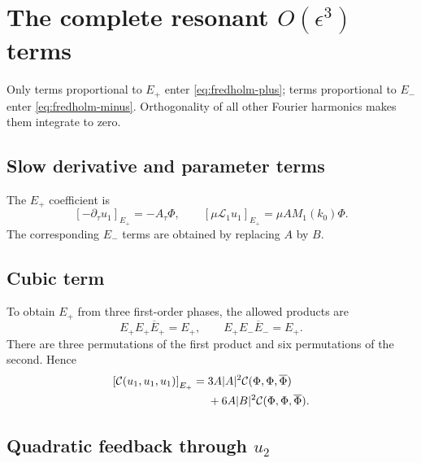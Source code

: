 \documentclass[11pt]{article}
\newcommand{\cC}{\mathcal{C}}
\newcommand{\cL}{\mathcal{L}}
\begin{document}
\section{The complete resonant \texorpdfstring{$O(\epsilon^3)$}{O(epsilon cubed)} terms}
\label{sec:o3-resonance}

Only terms proportional to $E_+$ enter \eqref{eq:fredholm-plus}; terms
proportional to $E_-$ enter \eqref{eq:fredholm-minus}.  Orthogonality of all
other Fourier harmonics makes them integrate to zero.

\subsection{Slow derivative and parameter terms}

The $E_+$ coefficient is
\begin{equation}
  \left[-\partial_\tau u_1\right]_{E_+}=-A_\tau\Phi,
  \qquad
  \left[\mu\cL_1u_1\right]_{E_+}
  =\mu A M_1(k_0)\Phi.
  \label{eq:linear-resonant}
\end{equation}
The corresponding $E_-$ terms are obtained by replacing $A$ by $B$.

\subsection{Cubic term}

To obtain $E_+$ from three first-order phases, the allowed products are
\begin{equation}
  E_+E_+\overline E_+=E_+,
  \qquad
  E_+E_-\overline E_-=E_+.
\end{equation}
There are three permutations of the first product and six permutations of
the second.  Hence
\begin{align}
\left[\cC(u_1,u_1,u_1)\right]_{E_+}
={}&3A|A|^2\cC(\Phi,\Phi,\overline\Phi)\notag\\
&+6A|B|^2\cC(\Phi,\Phi,\overline\Phi).
\label{eq:C-resonant}
\end{align}

\subsection{Quadratic feedback through \texorpdfstring{$u_2$}{u2}}
\end{document}
